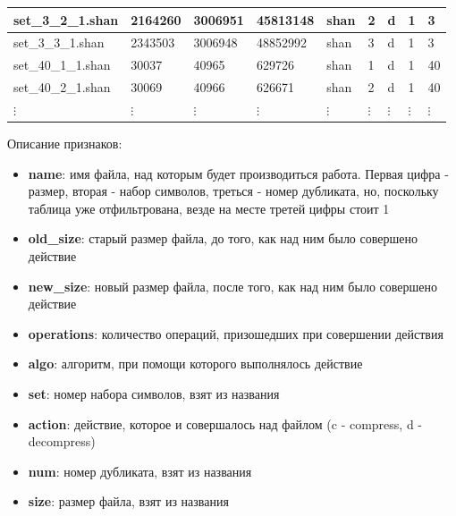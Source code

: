 \documentclass[russian, a4paper, 12pt]{article}
\begin{document}
\begin{tabular}{ | l | l | l | l | l | l | l | l | l | }
	set\_3\_2\_1.shan & 2164260 & 3006951 & 45813148 & shan & 2 & d & 1 & 3 \\ \hline
	set\_3\_3\_1.shan & 2343503 & 3006948 & 48852992 & shan & 3 & d & 1 & 3 \\ \hline
	set\_40\_1\_1.shan & 30037 & 40965 & 629726 & shan & 1 & d & 1 & 40 \\ \hline
	set\_40\_2\_1.shan & 30069 & 40966 & 626671 & shan & 2 & d & 1 & 40 \\ \hline
  $\vdots$ & $\vdots$ & $\vdots$ & $\vdots$ & $\vdots$ & $\vdots$ & $\vdots$ & $\vdots$ & $\vdots$ \\ \hline
\end{tabular}
\newpage
Описание признаков:
\begin{itemize}
  \item \textbf{name}: имя файла, над которым будет производиться работа. Первая цифра -
  размер, вторая - набор символов, треться - номер дубликата, но, поскольку таблица
  уже отфильтрована, везде на месте третей цифры стоит 1
  \item \textbf{old\_size}: старый размер файла, до того, как над ним было совершено действие
  \item \textbf{new\_size}: новый размер файла, после того, как над ним было совершено действие
  \item \textbf{operations}: количество операций, призошедших при совершении действия
  \item \textbf{algo}: алгоритм, при помощи которого выполнялось действие
  \item \textbf{set}: номер набора символов, взят из названия
  \item \textbf{action}: действие, которое и совершалось над файлом (c - compress, d - decompress)
  \item \textbf{num}: номер дубликата, взят из названия
  \item \textbf{size}: размер файла, взят из названия
\end{itemize}
\end{document}
